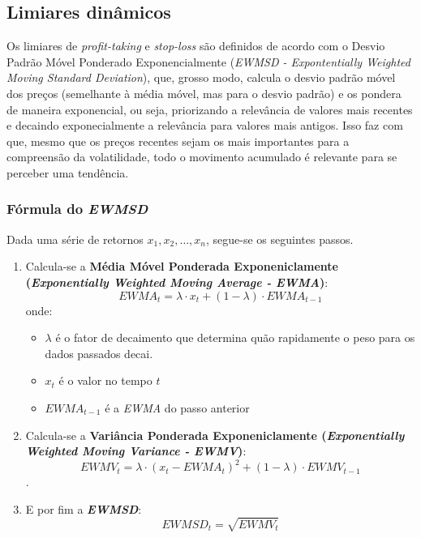 \documentclass{article}
\begin{document}
\subsection{Limiares dinâmicos}

Os limiares de \textit{profit-taking} e \textit{stop-loss} são definidos de acordo com o Desvio Padrão Móvel Ponderado Exponencialmente (\textit{EWMSD - Expontentially Weighted Moving Standard Deviation}), que, grosso modo, calcula o desvio padrão móvel dos preços (semelhante à média móvel, mas para o desvio padrão) e os pondera de maneira exponencial, ou seja, priorizando a relevância de valores mais recentes e decaindo exponecialmente a relevância para valores mais antigos. Isso faz com que, mesmo que os preços recentes sejam os mais importantes para a compreensão da volatilidade, todo o movimento acumulado é relevante para se perceber uma tendência.

\subsubsection{Fórmula do \textit{EWMSD}}
Dada uma série de retornos $x_1, x_2, \dots, x_n$, segue-se os seguintes passos.

\begin{enumerate}
    \item Calcula-se a \textbf{Média Móvel Ponderada Exponeniclamente (\textit{Exponentially Weighted Moving Average - EWMA})}: $$EWMA_t = \lambda \cdot x_t + (1 - \lambda) \cdot EWMA_{t - 1}$$ onde:

    \begin{itemize}
        \item $\lambda$ é o fator de decaimento que determina quão rapidamente o peso para os dados passados decai.
        \item $x_t$ é o valor no tempo $t$
        \item $EWMA_{t - 1}$ é a \textit{EWMA} do passo anterior
    \end{itemize}
    
    \item Calcula-se a \textbf{Variância Ponderada Exponeniclamente (\textit{Exponentially Weighted Moving Variance - EWMV})}: $$EWMV_t = \lambda \cdot (x_t - EWMA_t)^2 + (1 - \lambda) \cdot EWMV_{t - 1}$$.
    
    \item E por fim a \textbf{\textit{EWMSD}}: $$EWMSD_t = \sqrt{EWMV_t}$$
\end{enumerate}
\end{document}
